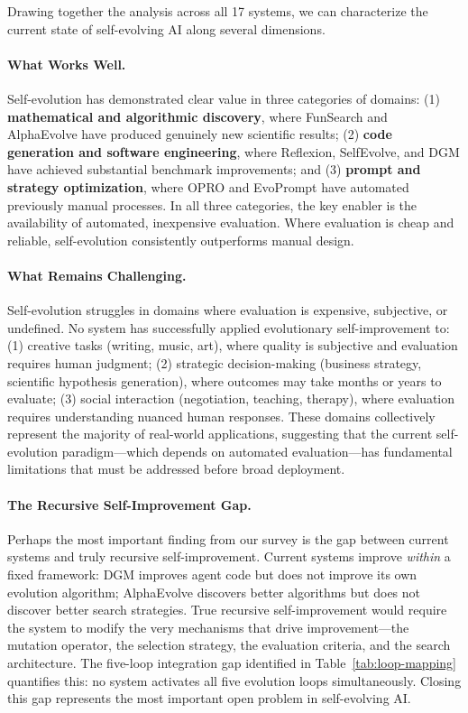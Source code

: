 Drawing together the analysis across all 17 systems, we can characterize the current state of self-evolving AI along several dimensions.

\paragraph{What Works Well.}
Self-evolution has demonstrated clear value in three categories of domains: (1) \textbf{mathematical and algorithmic discovery}, where FunSearch and AlphaEvolve have produced genuinely new scientific results; (2) \textbf{code generation and software engineering}, where Reflexion, SelfEvolve, and DGM have achieved substantial benchmark improvements; and (3) \textbf{prompt and strategy optimization}, where OPRO and EvoPrompt have automated previously manual processes. In all three categories, the key enabler is the availability of automated, inexpensive evaluation. Where evaluation is cheap and reliable, self-evolution consistently outperforms manual design.

\paragraph{What Remains Challenging.}
Self-evolution struggles in domains where evaluation is expensive, subjective, or undefined. No system has successfully applied evolutionary self-improvement to: (1) creative tasks (writing, music, art), where quality is subjective and evaluation requires human judgment; (2) strategic decision-making (business strategy, scientific hypothesis generation), where outcomes may take months or years to evaluate; (3) social interaction (negotiation, teaching, therapy), where evaluation requires understanding nuanced human responses. These domains collectively represent the majority of real-world applications, suggesting that the current self-evolution paradigm---which depends on automated evaluation---has fundamental limitations that must be addressed before broad deployment.

\paragraph{The Recursive Self-Improvement Gap.}
Perhaps the most important finding from our survey is the gap between current systems and truly recursive self-improvement. Current systems improve \emph{within} a fixed framework: DGM improves agent code but does not improve its own evolution algorithm; AlphaEvolve discovers better algorithms but does not discover better search strategies. True recursive self-improvement would require the system to modify the very mechanisms that drive improvement---the mutation operator, the selection strategy, the evaluation criteria, and the search architecture. The five-loop integration gap identified in Table~\ref{tab:loop-mapping} quantifies this: no system activates all five evolution loops simultaneously. Closing this gap represents the most important open problem in self-evolving AI.

